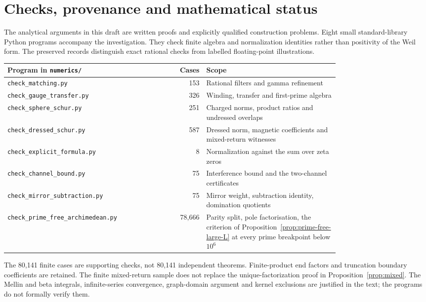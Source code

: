 \section{Checks, provenance and mathematical status}\label{app:checks}
The analytical arguments in this draft are written proofs and explicitly
qualified construction problems. Eight small standard-library Python
programs accompany the investigation. They check finite algebra and
normalization identities rather than positivity of the Weil form.
The preserved records distinguish exact rational checks from labelled
floating-point illustrations.
\begin{center}
\small
\begin{tabular}{p{0.38\linewidth}rp{0.40\linewidth}}
\toprule
Program in \texttt{numerics/} & Cases & Scope \\
\midrule
\texttt{check\_matching.py} & 153 & Rational filters and gamma refinement \\
\texttt{check\_gauge\_transfer.py} & 326 & Winding, transfer and first-prime algebra \\
\texttt{check\_sphere\_schur.py} & 251 & Charged norms, product ratios and undressed overlaps \\
\texttt{check\_dressed\_schur.py} & 587 & Dressed norm, magnetic coefficients and mixed-return witnesses \\
\texttt{check\_explicit\_formula.py} & 8 & Normalization against the sum over zeta zeros \\
\texttt{check\_channel\_bound.py} & 75 & Interference bound and the two-channel certificates \\
\texttt{check\_mirror\_subtraction.py} & 75 & Mirror weight, subtraction identity, domination quotients \\
\texttt{check\_prime\_free\_archimedean.py} & 78,666 & Parity split, pole factorisation, the criterion of Proposition~\ref{prop:prime-free-large-L} at every prime breakpoint below $10^6$ \\
\bottomrule
\end{tabular}
\end{center}
The 80,141 finite cases are supporting checks, not 80,141 independent
theorems. Finite-product end factors and truncation boundary
coefficients are retained. The finite mixed-return sample does not
replace the unique-factorization proof in Proposition~\ref{prop:mixed}.
The Mellin and beta integrals, infinite-series convergence,
graph-domain argument and kernel exclusions are justified in the text;
the programs do not formally verify them.

